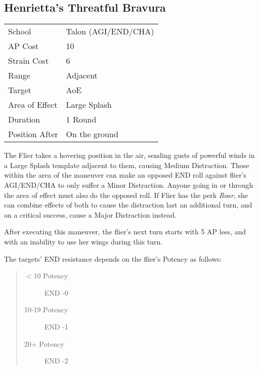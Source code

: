 \documentclass[11pt,a4paper,twocolumn]{book}
\begin{document}

\subsection*{Henrietta's Threatful Bravura}
{
	\begin{tabu} to 75mm{| X[l,4] | X[l,7] |}
		\hline
		School 			& Talon (AGI/END/CHA)			\\
		AP Cost	      	& 10                \\
		Strain Cost     & 6 				\\
		Range     		& Adjacent 				\\
		Target      	& AoE 				\\
		Area of Effect  & Large Splash 	 	\\
		Duration     	& 1 Round	 			\\
		Position After  & On the ground 	\\ \hline
	\end{tabu}
	
}

\medskip

The Flier takes a hovering position in the air, sending gusts of powerful winds in a Large Splash template adjacent to them, causing Medium Distraction. Those within the area of the maneuver can make an opposed END roll against flier's AGI/END/CHA to only suffer a Minor Distraction. Anyone going in or through the area of effect must also do the opposed roll. If Flier has the perk \textit{Roar}, she can combine effects of both to cause the distraction last an additional turn, and on a critical success, cause a Major Distraction instead. 

After executing this maneuver, the flier's next turn starts with 5 AP less, and with an inability to use her wings during this turn.

The targets' END resistance depends on the flier's Potency as follows:

\begin{quote}
	\begin{description}
		\item[$<$10 Potency] 	END -0
		\item[10-19 Potency] 	END -1
		\item[20+ Potency] 	    END -2
	\end{description}
\end{quote}

\end{document}
